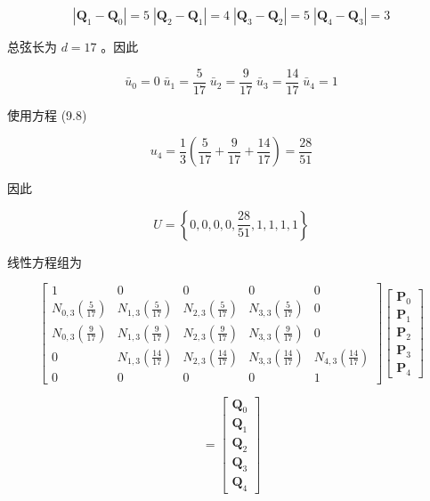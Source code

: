 \documentclass[../main.tex]{subfiles}
\begin{document}
\[
\left| {{\mathbf{Q}}_{1} - {\mathbf{Q}}_{0}}\right|  = 5\;\left| {{\mathbf{Q}}_{2} - {\mathbf{Q}}_{1}}\right|  = 4\;\left| {{\mathbf{Q}}_{3} - {\mathbf{Q}}_{2}}\right|  = 5\;\left| {{\mathbf{Q}}_{4} - {\mathbf{Q}}_{3}}\right|  = 3
\]

总弦长为 \(d = {17}\) 。因此

\[
{\bar{u}}_{0} = 0\;{\bar{u}}_{1} = \frac{5}{17}\;{\bar{u}}_{2} = \frac{9}{17}\;{\bar{u}}_{3} = \frac{14}{17}\;{\bar{u}}_{4} = 1
\]

使用方程 (9.8)

\[
{u}_{4} = \frac{1}{3}\left( {\frac{5}{17} + \frac{9}{17} + \frac{14}{17}}\right)  = \frac{28}{51}
\]





因此

\[
U = \left\{  {0,0,0,0,\frac{28}{51},1,1,1,1}\right\}
\]

线性方程组为

\[
\left\lbrack  \begin{matrix} 1 & 0 & 0 & 0 & 0 \\  {N}_{0,3}\left( \frac{5}{17}\right) & {N}_{1,3}\left( \frac{5}{17}\right) & {N}_{2,3}\left( \frac{5}{17}\right) & {N}_{3,3}\left( \frac{5}{17}\right) & 0 \\  {N}_{0,3}\left( \frac{9}{17}\right) & {N}_{1,3}\left( \frac{9}{17}\right) & {N}_{2,3}\left( \frac{9}{17}\right) & {N}_{3,3}\left( \frac{9}{17}\right) & 0 \\  0 & {N}_{1,3}\left( \frac{14}{17}\right) & {N}_{2,3}\left( \frac{14}{17}\right) & {N}_{3,3}\left( \frac{14}{17}\right) & {N}_{4,3}\left( \frac{14}{17}\right) \\  0 & 0 & 0 & 0 & 1 \end{matrix}\right\rbrack  \left\lbrack  \begin{matrix} {\mathbf{P}}_{0} \\  {\mathbf{P}}_{1} \\  {\mathbf{P}}_{2} \\  {\mathbf{P}}_{3} \\  {\mathbf{P}}_{4} \end{matrix}\right\rbrack
\]

\[
= \left\lbrack  \begin{array}{l} {\mathbf{Q}}_{0} \\  {\mathbf{Q}}_{1} \\  {\mathbf{Q}}_{2} \\  {\mathbf{Q}}_{3} \\  {\mathbf{Q}}_{4} \end{array}\right\rbrack
\]
\end{document}
